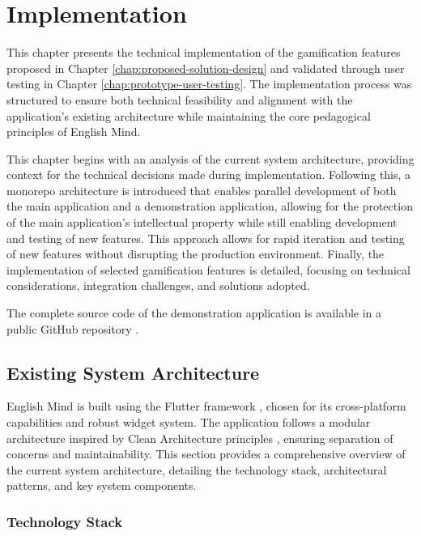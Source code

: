 \chapter{Implementation}
\label{chap:implementation}

This chapter presents the technical implementation of the gamification features proposed in Chapter \ref{chap:proposed-solution-design} and validated through user testing in Chapter \ref{chap:prototype-user-testing}. The implementation process was structured to ensure both technical feasibility and alignment with the application's existing architecture while maintaining the core pedagogical principles of English Mind.

This chapter begins with an analysis of the current system architecture, providing context for the technical decisions made during implementation. Following this, a monorepo architecture is introduced that enables parallel development of both the main application and a demonstration application, allowing for the protection of the main application's intellectual property while still enabling development and testing of new features. This approach allows for rapid iteration and testing of new features without disrupting the production environment. Finally, the implementation of selected gamification features is detailed, focusing on technical considerations, integration challenges, and solutions adopted.

The complete source code of the demonstration application is available in a public GitHub repository \cite{cite:source_code_repository}.

\section{Existing System Architecture}
\label{sec:existing-system-architecture}

English Mind is built using the Flutter framework \cite{cite:flutter_framework}, chosen for its cross-platform capabilities and robust widget system. The application follows a modular architecture inspired by Clean Architecture principles \cite{cite:clean_architecture}, ensuring separation of concerns and maintainability. This section provides a comprehensive overview of the current system architecture, detailing the technology stack, architectural patterns, and key system components.
\newpage
\subsection{Technology Stack}

